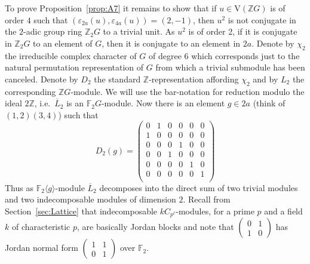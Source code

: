 \documentclass[10pt,a4paper,reqno]{amsart}
\theoremstyle{definition}
\theoremstyle{remark}
\newcommand{\V}{\mathrm{V}}
\newcommand{\ZZ}{\mathbb{Z}}
\begin{document}
{To prove Proposition~\ref{prop:A7} it remains to show that if $u \in \V(\ZZ G)$ is of order $4$ such that $(\varepsilon_{2a}(u), \varepsilon_{4a}(u)) = (2,-1)$, then $u^2$ is not conjugate in the $2$-adic group ring $\ZZ_2 G$ to a trivial unit. As $u^2$ is of order 2, if it is conjugate in $\ZZ_2 G$ to an element of $G$, then it is conjugate to an element in $2a$. Denote by $\chi_2$ the irreducible complex character of $G$ of degree $6$ which corresponds just to the natural permutation representation of $G$ from which a trivial submodule has been canceled. Denote by $D_2$ the standard $\ZZ$-representation affording $\chi_2$ and by $L_2$ the corresponding $\ZZ G$-module. We will use the bar-notation for reduction modulo the ideal $2\ZZ$, i.e.\ $\overline{L}_2$ is an $\mathbb{F}_2 G$-module. Now there is an element $g \in 2a$ (think of $(1,2)(3,4)$) such that 
$$D_2(g) = \begin{pmatrix} 
0 & 1 & 0 & 0 & 0 & 0 \\ 
1 & 0 & 0 & 0 & 0 & 0 \\ 
0 & 0 & 0 & 1 & 0 & 0 \\ 
0 & 0 & 1 & 0 & 0 & 0 \\ 
0 & 0 & 0 & 0 & 1 & 0 \\ 
0 & 0 & 0 & 0 & 0 & 1 \\ 
\end{pmatrix} $$
Thus as $\mathbb{F}_2 \langle g \rangle$-module $\overline{L}_2$ decomposes into the direct sum of two trivial modules and two indecomposable modules of dimension $2$. Recall from Section~\ref{sec:Lattice} that indecomposable $kC_{p^\ell}$-modules, for a prime $p$ and a field $k$ of characteristic $p$, are basically Jordan blocks and note that $\left(\begin{smallmatrix} 0 & 1 \\ 1 & 0 \end{smallmatrix}\right)$ has Jordan normal form $\left(\begin{smallmatrix} 1 & 1 \\ 0 & 1 \end{smallmatrix}\right)$  over $\mathbb{F}_2$.

}
\end{document}
